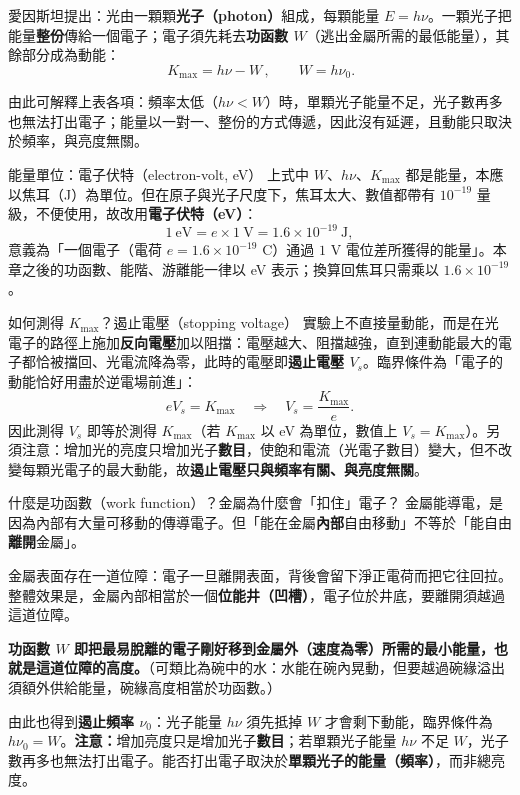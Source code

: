 \documentclass[11pt]{article}
\begin{document}
愛因斯坦提出：光由一顆顆\textbf{光子（photon）}組成，每顆能量 $E=h\nu$。一顆光子把能量\textbf{整份}傳給一個電子；電子須先耗去\textbf{功函數 $W$}（逃出金屬所需的最低能量），其餘部分成為動能：
$$\boxed{\,K_{\max}=h\nu-W\,},\qquad W=h\nu_0.$$

由此可解釋上表各項：頻率太低（$h\nu<W$）時，單顆光子能量不足，光子數再多也無法打出電子；能量以一對一、整份的方式傳遞，因此沒有延遲，且動能只取決於頻率，與亮度無關。

\begin{補充框}{能量單位：電子伏特（electron-volt, eV）}
上式中 $W$、$h\nu$、$K_{\max}$ 都是能量，本應以焦耳（J）為單位。但在原子與光子尺度下，焦耳太大、數值都帶有 $10^{-19}$ 量級，不便使用，故改用\textbf{電子伏特（eV）}：
$$1\ \text{eV}=e\times1\ \text{V}=1.6\times10^{-19}\ \text{J},$$
意義為「一個電子（電荷 $e=1.6\times10^{-19}$ C）通過 $1$ V 電位差所獲得的能量」。本章之後的功函數、能階、游離能一律以 eV 表示；換算回焦耳只需乘以 $1.6\times10^{-19}$。
\end{補充框}

\begin{補充框}{如何測得 $K_{\max}$？遏止電壓（stopping voltage）}
實驗上不直接量動能，而是在光電子的路徑上施加\textbf{反向電壓}加以阻擋：電壓越大、阻擋越強，直到連動能最大的電子都恰被擋回、光電流降為零，此時的電壓即\textbf{遏止電壓 $V_s$}。臨界條件為「電子的動能恰好用盡於逆電場前進」：
$$eV_s=K_{\max}\quad\Longrightarrow\quad V_s=\frac{K_{\max}}{e}.$$
因此測得 $V_s$ 即等於測得 $K_{\max}$（若 $K_{\max}$ 以 eV 為單位，數值上 $V_s=K_{\max}$）。另須注意：增加光的亮度只增加光子\textbf{數目}，使飽和電流（光電子數目）變大，但不改變每顆光電子的最大動能，故\textbf{遏止電壓只與頻率有關、與亮度無關}。
\end{補充框}


\begin{補充框}{什麼是功函數（work function）？金屬為什麼會「扣住」電子？}
金屬能導電，是因為內部有大量可移動的傳導電子。但「能在金屬\textbf{內部}自由移動」不等於「能自由\textbf{離開}金屬」。

金屬表面存在一道位障：電子一旦離開表面，背後會留下淨正電荷而把它往回拉。整體效果是，金屬內部相當於一個\textbf{位能井（凹槽）}，電子位於井底，要離開須越過這道位障。

\textbf{功函數 $W$ 即把最易脫離的電子剛好移到金屬外（速度為零）所需的最小能量，也就是這道位障的高度。}（可類比為碗中的水：水能在碗內晃動，但要越過碗緣溢出須額外供給能量，碗緣高度相當於功函數。）

由此也得到\textbf{遏止頻率 $\nu_0$}：光子能量 $h\nu$ 須先抵掉 $W$ 才會剩下動能，臨界條件為 $h\nu_0=W$。\textbf{注意：}增加亮度只是增加光子\textbf{數目}；若單顆光子能量 $h\nu$ 不足 $W$，光子數再多也無法打出電子。能否打出電子取決於\textbf{單顆光子的能量（頻率）}，而非總亮度。
\end{補充框}
\end{document}
